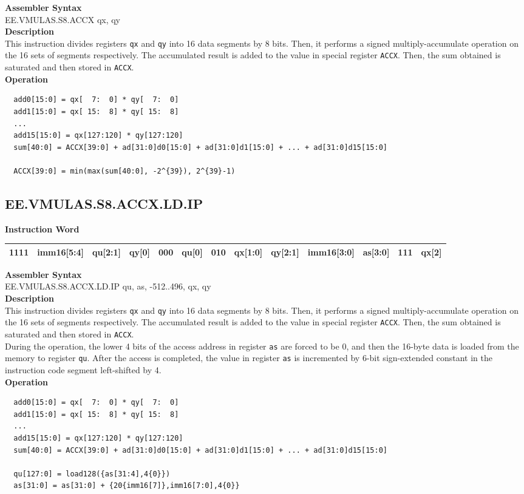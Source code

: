 \textbf{Assembler Syntax} \\
EE.VMULAS.S8.ACCX qx, qy \\
\textbf{Description} \\
This instruction divides registers \lstinline{qx} and \lstinline{qy} into 16 data segments by 8 bits. Then, it performs a signed multiply-accumulate operation on the 16 sets of segments respectively. The accumulated result is added to the value in special register \lstinline{ACCX}. Then, the sum obtained is saturated and then stored in \lstinline{ACCX}.\\
\textbf{Operation}
\begin{lstlisting}
  add0[15:0] = qx[  7:  0] * qy[  7:  0]
  add1[15:0] = qx[ 15:  8] * qy[ 15:  8]
  ...
  add15[15:0] = qx[127:120] * qy[127:120]
  sum[40:0] = ACCX[39:0] + ad[31:0]d0[15:0] + ad[31:0]d1[15:0] + ... + ad[31:0]d15[15:0]

  ACCX[39:0] = min(max(sum[40:0], -2^{39}), 2^{39}-1)
\end{lstlisting}

\clearpage
\subsection{EE.VMULAS.S8.ACCX.LD.IP}\label{instruction:EEVMULASS8ACCXLDIP}
\setlength\tabcolsep{6pt}
\textbf{Instruction Word} \\
\begin{tabular}{|c|c|c|c|c|c|c|c|c|c|c|c|c|}
	\hline
	1111 & imm16[5:4] & qu[2:1] & qy[0] & 000 & qu[0] & 010 & qx[1:0] & qy[2:1] & imm16[3:0] & as[3:0] & 111 & qx[2] \\
	\hline
\end{tabular}

\textbf{Assembler Syntax} \\
EE.VMULAS.S8.ACCX.LD.IP qu, as, -512..496, qx, qy \\
\textbf{Description} \\
This instruction divides registers \lstinline{qx} and \lstinline{qy} into 16 data segments by 8 bits. Then, it performs a signed multiply-accumulate operation on the 16 sets of segments respectively. The accumulated result is added to the value in special register \lstinline{ACCX}. Then, the sum obtained is saturated and then stored in \lstinline{ACCX}. \\ During the operation, the lower 4 bits of the access address in register \lstinline{as} are forced to be 0, and then the 16-byte data is loaded from the memory to register \lstinline{qu}. After the access is completed, the value in register \lstinline{as} is incremented by 6-bit sign-extended constant in the instruction code segment left-shifted by 4.\\
\textbf{Operation}
\begin{lstlisting}
  add0[15:0] = qx[  7:  0] * qy[  7:  0]
  add1[15:0] = qx[ 15:  8] * qy[ 15:  8]
  ...
  add15[15:0] = qx[127:120] * qy[127:120]
  sum[40:0] = ACCX[39:0] + ad[31:0]d0[15:0] + ad[31:0]d1[15:0] + ... + ad[31:0]d15[15:0]

  qu[127:0] = load128({as[31:4],4{0}})
  as[31:0] = as[31:0] + {20{imm16[7]},imm16[7:0],4{0}}
\end{lstlisting}

